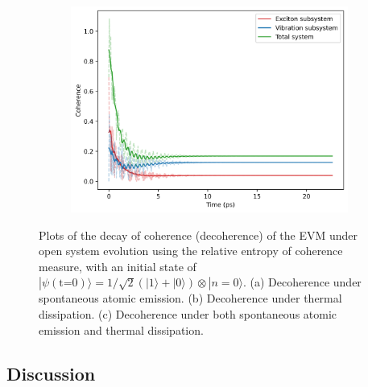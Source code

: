 \documentclass[11pt]{article}
\begin{document}
\begin{figure}[H]
    \vspace{0.5cm}
    
    \begin{subfigure}{0.45\textwidth}
        \centering
        \includegraphics[width=\linewidth]{Research Project/Code/results/ExVib/Open/Coherence/coh_both_eg.png}
        \caption{}
        \label{fig:EVM_OQS_Coh_both_eg}
    \end{subfigure}
    \hfill

    \caption{Plots of the decay of coherence (decoherence) of the EVM under open system evolution using the relative entropy of coherence measure, with an initial state of $|\psi (\text{t=0})\rangle = 1/\sqrt{2}(|1\rangle + |0\rangle)\otimes|n=0\rangle$. (a) Decoherence under spontaneous atomic emission. (b) Decoherence under thermal dissipation. (c) Decoherence under both spontaneous atomic emission and thermal dissipation.}
    \label{fig:EVM_OQS_Coh_eg}
\end{figure}

\subsection{Discussion}
\end{document}
